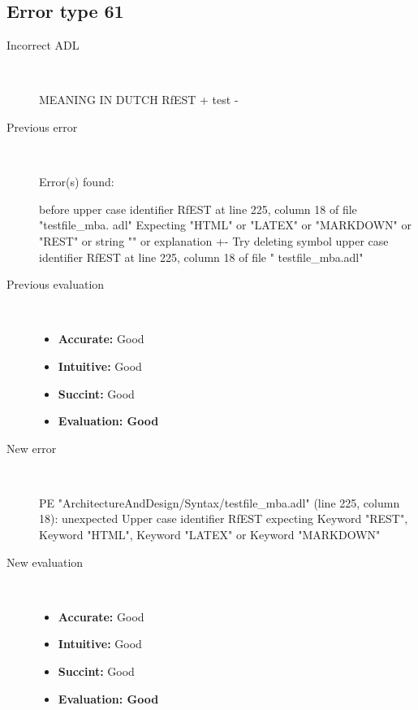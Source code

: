 \subsection{Error type 61}
  \begin{description}
  \item[Incorrect ADL]~\\
\begin{adl}
MEANING IN DUTCH RfEST {+ test -}\end{adl}
  \item[Previous error]~\\
\begin{haskell}
Error(s) found:

before upper case identifier RfEST at line 225, column 18 of file "testfile_mba.
adl"
Expecting "HTML" or "LATEX" or "MARKDOWN" or "REST" or string "" or explanation
{+-}
Try deleting symbol upper case identifier RfEST at line 225, column 18 of file "
testfile_mba.adl"\end{haskell}
  \item[Previous evaluation]~\\
    \begin{itemize}
    \item \textbf{Accurate:} Good
    \item \textbf{Intuitive:} Good
    \item \textbf{Succint:} Good
    \item \textbf{Evaluation: Good}
    \end{itemize}
  \item[New error]~\\
\begin{haskell}
PE "ArchitectureAndDesign/Syntax/testfile_mba.adl" (line 225, column 18):
unexpected Upper case identifier RfEST
expecting Keyword "REST", Keyword "HTML", Keyword "LATEX" or Keyword "MARKDOWN"
\end{haskell}
  \item[New evaluation]~\\
    \begin{itemize}
    \item \textbf{Accurate:} Good
    \item \textbf{Intuitive:} Good
    \item \textbf{Succint:} Good
    \item \textbf{Evaluation: Good
}
    \end{itemize}
  \end{description}

\hrulefill

